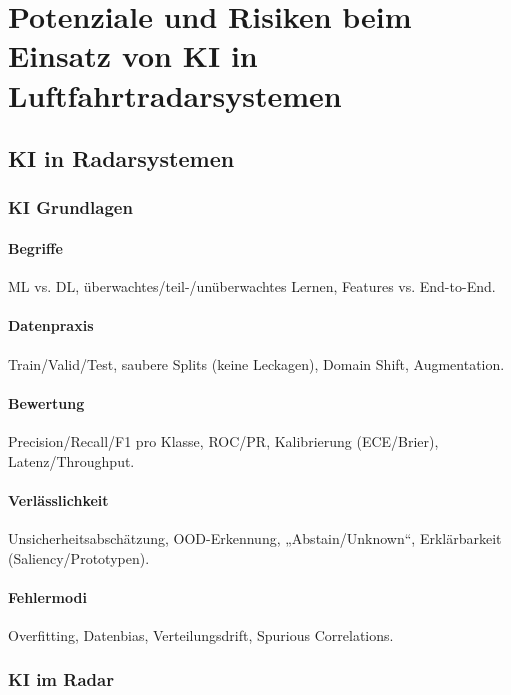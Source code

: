 \part{Potenziale und Risiken beim Einsatz von KI in Luftfahrtradarsystemen}
\chapter{KI in Radarsystemen}

\section{KI Grundlagen}

\subsection{Begriffe}
ML vs. DL, überwachtes/teil-/unüberwachtes Lernen, Features vs. End-to-End.

\subsection{Datenpraxis}
Train/Valid/Test, saubere Splits (keine Leckagen), Domain Shift, Augmentation.

\subsection{Bewertung}
Precision/Recall/F1 pro Klasse, ROC/PR, Kalibrierung (ECE/Brier), Latenz/Throughput.

\subsection{Verlässlichkeit}
Unsicherheitsabschätzung, OOD-Erkennung, „Abstain/Unknown“, Erklärbarkeit (Saliency/Prototypen).

\subsection{Fehlermodi}
Overfitting, Datenbias, Verteilungsdrift, Spurious Correlations.




\section{KI im Radar}

